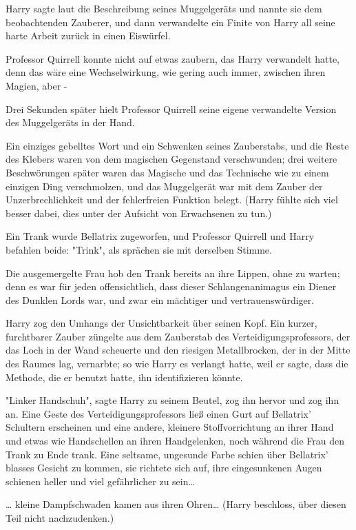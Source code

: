 {Harry sagte laut die Beschreibung seines Muggelgeräts und nannte sie dem beobachtenden Zauberer, und dann verwandelte ein Finite von Harry all seine harte Arbeit zurück in einen Eiswürfel.

Professor Quirrell konnte nicht auf etwas zaubern, das Harry verwandelt hatte, denn das wäre eine Wechselwirkung, wie gering auch immer, zwischen ihren Magien, aber -

Drei Sekunden später hielt Professor Quirrell seine eigene verwandelte Version des Muggelgeräts in der Hand.

Ein einziges gebelltes Wort und ein Schwenken seines Zauberstabs, und die Reste des Klebers waren von dem magischen Gegenstand verschwunden; drei weitere Beschwörungen später waren das Magische und das Technische wie zu einem einzigen Ding verschmolzen, und das Muggelgerät war mit dem Zauber der Unzerbrechlichkeit und der fehlerfreien Funktion belegt. (Harry fühlte sich viel besser dabei, dies unter der Aufsicht von Erwachsenen zu tun.)

Ein Trank wurde Bellatrix zugeworfen, und Professor Quirrell und Harry befahlen beide: "Trink", als sprächen sie mit derselben Stimme.

Die ausgemergelte Frau hob den Trank bereits an ihre Lippen, ohne zu warten; denn es war für jeden offensichtlich, dass dieser Schlangenanimagus ein Diener des Dunklen Lords war, und zwar ein mächtiger und vertrauenswürdiger.

Harry zog den Umhangs der Unsichtbarkeit über seinen Kopf. Ein kurzer, furchtbarer Zauber züngelte aus dem Zauberstab des Verteidigungsprofessors, der das Loch in der Wand scheuerte und den riesigen Metallbrocken, der in der Mitte des Raumes lag, vernarbte; so wie Harry es verlangt hatte, weil er sagte, dass die Methode, die er benutzt hatte, ihn identifizieren könnte.

"Linker Handschuh", sagte Harry zu seinem Beutel, zog ihn hervor und zog ihn an. Eine Geste des Verteidigungsprofessors ließ einen Gurt auf Bellatrix' Schultern erscheinen und eine andere, kleinere Stoffvorrichtung an ihrer Hand und etwas wie Handschellen an ihren Handgelenken, noch während die Frau den Trank zu Ende trank. Eine seltsame, ungesunde Farbe schien über Bellatrix' blasses Gesicht zu kommen, sie richtete sich auf, ihre eingesunkenen Augen schienen heller und viel gefährlicher zu sein…

… kleine Dampfschwaden kamen aus ihren Ohren… (Harry beschloss, über diesen Teil nicht nachzudenken.)

}
